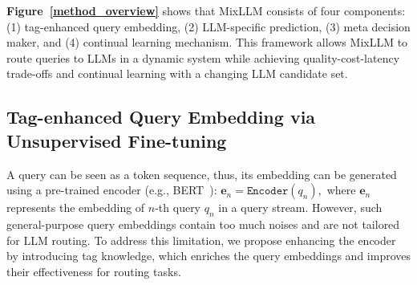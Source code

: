 \textbf{Figure~\ref{method_overview}} shows that MixLLM consists of four components: (1) tag-enhanced query embedding, (2) LLM-specific prediction, (3) meta decision maker, and (4) continual learning mechanism. This framework allows MixLLM to route queries to LLMs in a dynamic system while achieving quality-cost-latency trade-offs and continual learning with a changing LLM candidate set.

\subsection{Tag-enhanced Query Embedding via Unsupervised Fine-tuning}
A query can be seen as a token sequence, thus, its embedding can be generated using a pre-trained encoder (e.g., BERT~\cite{devlin-etal-2019-bert}):
$
    \mathbf{e}_n = \texttt{Encoder}(q_n),
$
where $\mathbf{e}_n$ represents the embedding of $n$-th query $q_n$ in a query stream.
However, such general-purpose query embeddings contain too much noises and are not tailored for LLM routing. 
To address this limitation, we propose enhancing the encoder by introducing tag knowledge, which enriches the query embeddings and improves their effectiveness for routing tasks.

